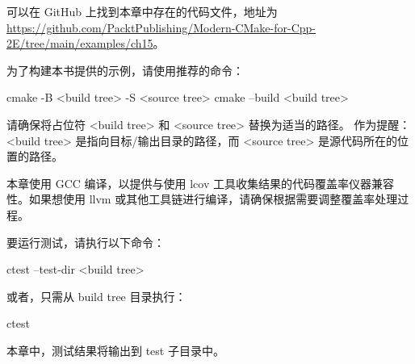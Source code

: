 可以在 GitHub 上找到本章中存在的代码文件，地址为 \url{https://github.com/PacktPublishing/Modern-CMake-for-Cpp-2E/tree/main/examples/ch15}。

为了构建本书提供的示例，请使用推荐的命令：

\begin{shell}
cmake -B <build tree> -S <source tree>
cmake --build <build tree>
\end{shell}

请确保将占位符 <build tree> 和 <source tree> 替换为适当的路径。
作为提醒：<build tree> 是指向目标/输出目录的路径，而  <source tree> 是源代码所在的位置的路径。

本章使用 GCC 编译，以提供与使用 lcov 工具收集结果的代码覆盖率仪器兼容性。如果想使用 llvm 或其他工具链进行编译，请确保根据需要调整覆盖率处理过程。

要运行测试，请执行以下命令：

\begin{shell}
ctest --test-dir <build tree>
\end{shell}

或者，只需从 build tree 目录执行：

\begin{shell}
ctest
\end{shell}

本章中，测试结果将输出到 test 子目录中。

















